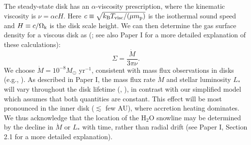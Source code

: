 \documentclass[apj]{emulateapj}
\begin{document}
The steady-state disk has an $\alpha$-viscosity prescription, where the kinematic viscosity is $\nu=\alpha c H$. Here $c \equiv \sqrt{k_{\rm B} T_{\rm visc} /(\mu m_{\rm p})}$ is the isothermal sound speed and $H \equiv c/\Omega_{\rm k}$ is the disk scale height. We can then determine the gas surface density for a viscous disk as (\citealt{shakura73}; see also Paper I for a more detailed explanation of these calculations):
\begin{equation}
\label{eq:Sigmaact}
\Sigma=\frac{\dot{M}}{3 \pi \nu}.
\end{equation}
We choose $\dot{M}=10^{-8} M_{\odot}$ yr$^{-1}$, consistent with mass flux observations in disks (e.g., \citealt{andrews10}). As described in Paper I, the mass flux rate $\dot{M}$ and stellar luminosity $L_*$ will vary throughout the disk lifetime (\citealt{kennedy06}, \citealt{chambers09}), in contrast with our simplified model which assumes that both quantities are constant. This effect will be most pronounced in the inner disk ($\lesssim$ few AU), where accretion heating dominates. We thus acknowledge that the location of the H$_2$O snowline may be determined by the decline in $\dot{M}$ or $L_*$ with time, rather than radial drift (see Paper I, Section 2.1 for a more detailed explanation). 

%
\end{document}
